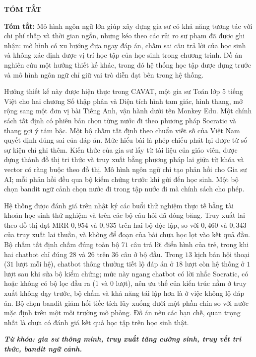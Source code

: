 \begin{center}
{\fontsize{13}{16}\selectfont\bfseries TÓM TẮT}
\end{center}


{\fontsize{12}{16}\selectfont
\noindent\textbf{Tóm tắt:} Mô hình ngôn ngữ lớn giúp xây dựng gia sư có khả năng tương tác với chi phí thấp và thời gian ngắn, nhưng kéo theo các rủi ro sư phạm đã được ghi nhận: mô hình có xu hướng đưa ngay đáp án, chấm sai câu trả lời của học sinh và không xác định được vị trí học tập của học sinh trong chương trình. Đồ án nghiên cứu một hướng thiết kế khác, trong đó hệ thống học tập được dựng trước và mô hình ngôn ngữ chỉ giữ vai trò diễn đạt bên trong hệ thống.

Hướng thiết kế này được hiện thực trong CAVAT, một gia sư Toán lớp 5 tiếng Việt cho hai chương Số thập phân và Diện tích hình tam giác, hình thang, mở rộng sang một đơn vị bài Tiếng Anh, vận hành dưới tên Monkey Edu. Một chính sách tất định có phiên bản chọn từng nước đi theo phương pháp Socratic và thang gợi ý tám bậc. Một bộ chấm tất định theo chuẩn viết số của Việt Nam quyết định đúng sai của đáp án. Mức hiểu bài là phép chiếu phát lại được từ sổ sự kiện chỉ ghi thêm. Kiến thức của gia sư lấy từ tài liệu của giáo viên, được dựng thành đồ thị tri thức và truy xuất bằng phương pháp lai giữa từ khóa và vector có ràng buộc theo đồ thị. Mô hình ngôn ngữ chỉ tạo phản hồi cho Gia sư AI; mỗi phản hồi đều qua bộ kiểm chứng trước khi gửi đến học sinh. Một bộ chọn bandit ngữ cảnh chọn nước đi trong tập nước đi mà chính sách cho phép.

Hệ thống được đánh giá trên nhật ký các buổi thử nghiệm thực tế bằng tài khoản học sinh thử nghiệm và trên các bộ câu hỏi đã đóng băng. Truy xuất lai theo đồ thị đạt MRR $0{,}954$ và $0{,}935$ trên hai bộ độc lập, so với $0{,}460$ và $0{,}343$ của truy xuất lai thuần, và không để đoạn của bài chưa học lọt vào kết quả đầu. Bộ chấm tất định chấm đúng toàn bộ $71$ câu trả lời điển hình của trẻ, trong khi hai chatbot chỉ đúng $28$ và $26$ trên $36$ câu ở bộ đầu. Trong $13$ kịch bản hội thoại ($31$ lượt mỗi hệ), chatbot thông thường tiết lộ đáp án ở $18$ lượt còn hệ thống ở $1$ lượt sau khi sửa bộ kiểm chứng; mức này ngang chatbot có lời nhắc Socratic, có hoặc không có bộ lọc đầu ra ($1$ và $0$ lượt), nên ưu thế của kiến trúc nằm ở truy xuất không dạy trước, bộ chấm và khả năng tái lập hơn là ở việc không lộ đáp án. Bộ chọn bandit giảm hối tiếc tích lũy xuống dưới một phần chín so với nước mặc định trên một môi trường mô phỏng. Đồ án nêu các hạn chế, quan trọng nhất là chưa có đánh giá kết quả học tập trên học sinh thật.

\vspace{6pt}
\noindent\textbf{\textit{Từ khóa: gia sư thông minh, truy xuất tăng cường sinh, truy vết tri thức, bandit ngữ cảnh.}}
}
